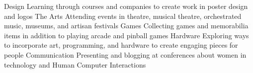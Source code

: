   \begin{cvskills} 
     	 \cvskill
      		{Design}
      		{Learning through courses and companies to create work in poster design and logos}
	 \cvskill
		{The Arts}
		{Attending events in theatre, musical theatre, orchestrated music, museums, and artisan festivals}
	\cvskill
		{Games}
		{Collecting games and memorabilia items in addition to playing arcade and pinball games}
  	\cvskill
		{Hardware}
		{Exploring ways to incorporate art, programming, and hardware to create engaging pieces for people}
	\cvskill
		{Communication}
		{Presenting and blogging at conferences about women in technology and Human Computer Interactions}
  \end{cvskills}